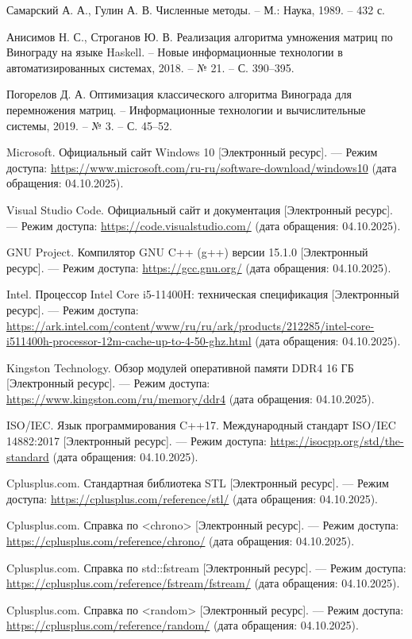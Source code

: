 
\begin{thebibliography}{99}
	
	 Самарский А. А., Гулин А. В. Численные методы. – М.: Наука, 1989. – 432 с.
			
	 Анисимов Н. С., Строганов Ю. В. Реализация алгоритма умножения матриц по Винограду на языке Haskell. – Новые информационные технологии в автоматизированных системах, 2018. – № 21. – С. 390–395.

	 Погорелов Д. А. Оптимизация классического алгоритма Винограда для перемножения матриц. – Информационные технологии и вычислительные системы, 2019. – № 3. – С. 45–52.

	 Microsoft. Официальный сайт Windows 10 [Электронный ресурс]. — Режим доступа: \url{https://www.microsoft.com/ru-ru/software-download/windows10} (дата обращения: 04.10.2025).
	
	 Visual Studio Code. Официальный сайт и документация [Электронный ресурс]. — Режим доступа: \url{https://code.visualstudio.com/} (дата обращения: 04.10.2025).
	
	 GNU Project. Компилятор GNU C++ (g++) версии 15.1.0 [Электронный ресурс]. — Режим доступа: \url{https://gcc.gnu.org/} (дата обращения: 04.10.2025).  
	
	 Intel. Процессор Intel Core i5-11400H: техническая спецификация [Электронный ресурс]. — Режим доступа: \url{https://ark.intel.com/content/www/ru/ru/ark/products/212285/intel-core-i511400h-processor-12m-cache-up-to-4-50-ghz.html} (дата обращения: 04.10.2025).  
	
	 Kingston Technology. Обзор модулей оперативной памяти DDR4 16 ГБ [Электронный ресурс]. — Режим доступа: \url{https://www.kingston.com/ru/memory/ddr4} (дата обращения: 04.10.2025).  
	
	 ISO/IEC. Язык программирования C++17. Международный стандарт ISO/IEC 14882:2017 [Электронный ресурс]. — Режим доступа: \url{https://isocpp.org/std/the-standard} (дата обращения: 04.10.2025).  
	
	 Cplusplus.com. Стандартная библиотека STL [Электронный ресурс]. — Режим доступа: \url{https://cplusplus.com/reference/stl/} (дата обращения: 04.10.2025).
	
	 Cplusplus.com. Справка по <chrono> [Электронный ресурс]. — Режим доступа: \url{https://cplusplus.com/reference/chrono/} (дата обращения: 04.10.2025).  
	  
	 Cplusplus.com. Справка по std::fstream [Электронный ресурс]. — Режим доступа: \url{https://cplusplus.com/reference/fstream/fstream/} (дата обращения: 04.10.2025).  

	 Cplusplus.com. Справка по <random> [Электронный ресурс]. — Режим доступа: \url{https://cplusplus.com/reference/random/} (дата обращения: 04.10.2025).
	
\end{thebibliography}

